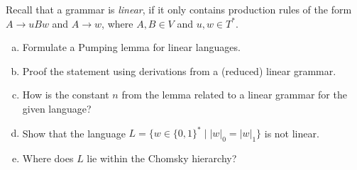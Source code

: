 \documentclass[a4paper,12pt]{amsart}
\begin{document}
\medskip\begin{problem}
    
    Recall that a grammar is \emph{linear}, if it only contains production rules of the form $A\to uBw$ and $A\to w$, where $A,B\in V$ and $u,w\in T^*$.
    
    \bigskip
    
    \begin{enumerate}[(a)]
        \setlength\itemsep{1em}
        \item Formulate a Pumping lemma for linear languages.
        \item Proof the statement using derivations from a (reduced) linear grammar.
        \item How is the constant $n$ from the lemma related to a linear grammar for the given language?
        \item Show that the language $L=\{w\in \{0,1\}^*\mid |w|_0=|w|_1\}$ is not linear.
        \item Where does $L$ lie within the Chomsky hierarchy?
    \end{enumerate}
    
\end{problem}
\end{document}
